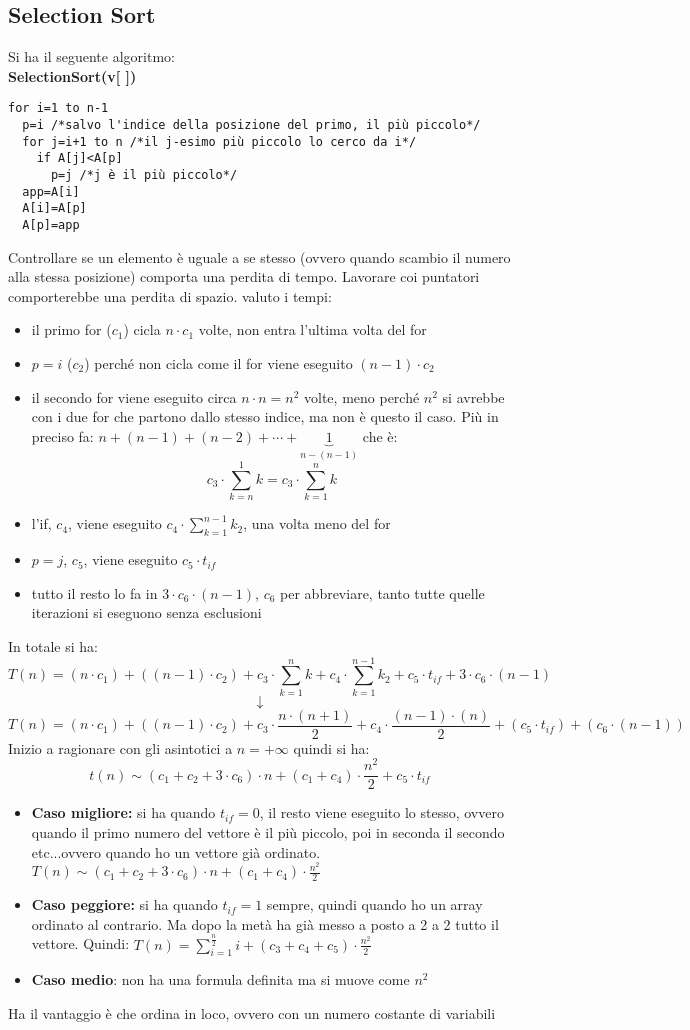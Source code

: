 \documentclass[a4paper,12pt,oneside,tikz]{book}
\begin{document}
\subsection{Selection Sort}
Si ha il seguente algoritmo:\\
\textbf{SelectionSort(v[ ])}
\begin{verbatim}
for i=1 to n-1 
  p=i /*salvo l'indice della posizione del primo, il più piccolo*/
  for j=i+1 to n /*il j-esimo più piccolo lo cerco da i*/
    if A[j]<A[p]
      p=j /*j è il più piccolo*/
  app=A[i]
  A[i]=A[p]
  A[p]=app
\end{verbatim}
Controllare se un elemento è uguale a se stesso (ovvero quando scambio il numero alla stessa posizione) comporta una perdita di tempo. Lavorare coi puntatori comporterebbe una perdita di spazio. 
valuto i tempi:
\begin{itemize}
\item il primo for ($c_1$) cicla $n\cdot c_1$ volte, non entra l'ultima volta del for
\item $p=i$ ($c_2$) perché non cicla come il for viene eseguito $(n-1)\cdot c_2$
\item il secondo for viene eseguito circa $n\cdot n=n^2$ volte, meno perché $n^2$ si avrebbe con i due for che partono dallo stesso indice, ma non è questo il caso. Più in preciso fa: $n+(n-1)+(n-2)+\cdots+\underbrace{1}_{n-(n-1)}$ che è:
$$c_3\cdot\sum_{k=n}^1 k=c_3\cdot\sum_{k=1}^n k $$
\item l'if, $c_4$, viene eseguito $c_4\cdot\sum_{k=1}^{n-1} k_2$, una volta meno del for
\item $p=j$, $c_5$, viene eseguito $c_5\cdot t_{if}$
\item tutto il resto lo fa in $3\cdot c_6\cdot(n-1)$, $c_6$ per abbreviare, tanto tutte quelle iterazioni si eseguono senza esclusioni
\end{itemize}

In totale si ha: $$T(n)=(n\cdot c_1)+((n-1)\cdot c_2)+c_3\cdot\sum_{k=1}^n k+c_4\cdot\sum_{k=1}^{n-1} k_2+c_5\cdot t_{if}+3\cdot c_6\cdot(n-1)$$
$$\downarrow$$
$$T(n)=(n\cdot c_1)+((n-1)\cdot c_2)+c_3\cdot\frac{n\cdot(n+1)}{2}+c_4\cdot\frac{(n-1) \cdot(n)}{2}+(c_5\cdot t_{if})+(c_6\cdot(n-1))$$
Inizio a ragionare con gli asintotici a $n=+\infty$ quindi si ha:
$$t(n)\sim (c_1+c_2+3\cdot c_6)\cdot n+(c_1+c_4)\cdot\frac{n^2}{2}+c_5\cdot t_{if}$$

\begin{itemize}
\item \textbf{Caso migliore:} si ha quando $t_{if}=0$, il resto viene eseguito lo stesso, ovvero quando il primo numero del vettore è il più piccolo, poi in seconda il secondo etc...ovvero quando ho un vettore già ordinato. $T(n)\sim (c_1+c_2+3\cdot c_6)\cdot n+(c_1+c_4)\cdot\frac{n^2}{2}$
\item \textbf{Caso peggiore:} si ha quando $t_{if}=1$ sempre, quindi quando ho un array ordinato al contrario. Ma dopo la metà ha già messo a posto a 2 a 2 tutto il vettore. Quindi: $T(n)=\sum_{i=1}^{\frac{n}{2}}i+(c_3+c_4+c_5)\cdot\frac{n^2}{2}$
\item \textbf{Caso medio}: non ha una formula definita ma si muove come $n^2$
\end{itemize}
Ha il vantaggio è che ordina in loco, ovvero con un numero costante di variabili
\end{document}
